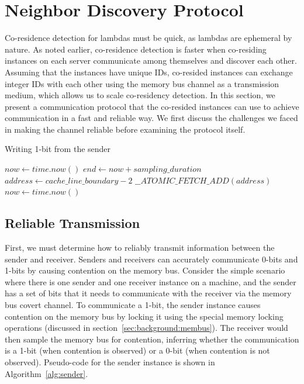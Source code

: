 \section{Neighbor Discovery Protocol}
\label{sec:technique}
 
Co-residence detection for lambdas must be quick, as lambdas are ephemeral by
nature. As noted earlier, co-residence detection is faster when co-residing
instances on each server communicate among themselves and discover each other.
Assuming that the instances have unique IDs, co-resided instances can exchange
integer IDs with each other using the memory bus channel as a transmission
medium, which allows us to scale co-residency detection.  In this section, we
present a communication protocol that the co-resided instances can use to
achieve communication in a fast and reliable way. We first discuss the
challenges we faced in making the channel reliable before examining the protocol
itself.

\begin{algorithm}[!t]
\caption{Writing 1-bit from the sender}
\label{alg:sender}
\begin{algorithmic}
\STATE $now \leftarrow  time.now()$
\STATE $end \leftarrow now + sampling\_duration$
\STATE $address \leftarrow cache\_line\_boundary-2$
    \STATE $\_\_ATOMIC\_FETCH\_ADD(address)$
    \STATE $now \leftarrow  time.now()$
\ENDWHILE
\end{algorithmic}
\end{algorithm}

\subsection{Reliable Transmission}
First, we must determine how to reliably transmit information between the sender
and receiver. Senders and receivers can accurately communicate 0-bits and 1-bits
by causing contention on the memory bus. Consider the simple scenario where
there is one sender and one receiver instance on a machine, and the sender has a
set of bits that it needs to communicate with the receiver via the memory bus
covert channel.  To communicate a 1-bit, the sender instance causes contention
on the memory bus by locking it using the special memory locking operations
(discussed in section~\ref{sec:background:membus}). The receiver would then
sample the memory bus for contention, inferring whether the communication is a
1-bit (when contention is observed) or a 0-bit (when contention is not
observed). Pseudo-code for the sender instance is shown in
Algorithm~\ref{alg:sender}.

